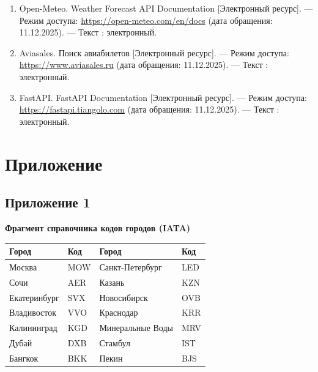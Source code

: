 \documentclass[14pt,a4paper,oneside]{extreport}
\begin{document}
\begin{enumerate}
  \item Open-Meteo. Weather Forecast API Documentation [Электронный ресурс]. — Режим доступа: \url{https://open-meteo.com/en/docs} (дата обращения: 11.12.2025). — Текст : электронный.

  \item Aviasales. Поиск авиабилетов [Электронный ресурс]. — Режим доступа: \url{https://www.aviasales.ru} (дата обращения: 11.12.2025). — Текст : электронный.

  \item FastAPI. FastAPI Documentation [Электронный ресурс]. — Режим доступа: \url{https://fastapi.tiangolo.com} (дата обращения: 11.12.2025). — Текст : электронный.

\end{enumerate}


\chapter*{Приложение}


\section*{Приложение 1}

\begin{table}[htbp]\centering

\textbf{Фрагмент справочника кодов городов (IATA)}\par\vspace{4pt}

\begin{center}
\small
\begin{tabularx}{\textwidth}{|X|X|X|X|}
\hline
Город & Код & Город & Код \\
\hline
Москва & MOW & Санкт-Петербург & LED \\
\hline
Сочи & AER & Казань & KZN \\
\hline
Екатеринбург & SVX & Новосибирск & OVB \\
\hline
Владивосток & VVO & Краснодар & KRR \\
\hline
Калининград & KGD & Минеральные Воды & MRV \\
\hline
Дубай & DXB & Стамбул & IST \\
\hline
Бангкок & BKK & Пекин & BJS \\
\hline
\end{tabularx}
\end{center}

\end{table}
\end{document}
